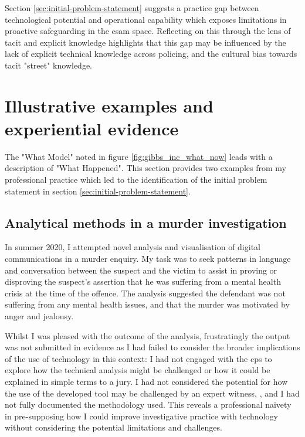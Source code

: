 \documentclass[12pt,a4paper,oneside]{report}
\begin{document}
Section \ref{sec:initial-problem-statement} suggests a practice gap between technological potential and operational capability which exposes limitations in proactive safeguarding in the \gls{csam} space.  Reflecting on this through the lens of tacit and explicit knowledge highlights that this gap may be influenced by the lack of explicit technical knowledge across policing, and the cultural bias towards tacit "street" knowledge.

\section{Illustrative examples and experiential evidence}
\label{sec:illustrative-and-experiential-evidence}
The "What Model" noted in figure \ref{fig:gibbs_inc_what_now} leads with a description of "What Happened".  This section provides two examples from my professional practice which led to the identification of the initial problem statement in section \ref{sec:initial-problem-statement}.

\subsection{Analytical methods in a murder investigation}
\label{subsec:analytical-methods-in-a-murder-investigation}
In summer 2020, I attempted novel analysis and visualisation of digital communications in a murder enquiry.  My task was to seek patterns in language and conversation between the suspect and the victim to assist in proving or disproving the suspect's assertion that he was suffering from a mental health crisis at the time of the offence.  The analysis suggested the defendant was not suffering from any mental health issues, and that the murder was motivated by anger and jealousy.

Whilst I was pleased with the outcome of the analysis, frustratingly the output was not submitted in evidence as I had failed to consider the broader implications of the use of technology in this context: I had not engaged with the \gls{cps} to explore how the technical analysis might be challenged or how it could be explained in simple terms to a jury.  I had not considered the potential for how the use of the developed tool may be challenged by an expert witness, \citep{lawcommission2011expert}, and I had not fully documented the methodology used.  This reveals a professional naivety in pre-supposing how I could improve investigative practice with technology without considering the potential limitations and challenges.
\end{document}
